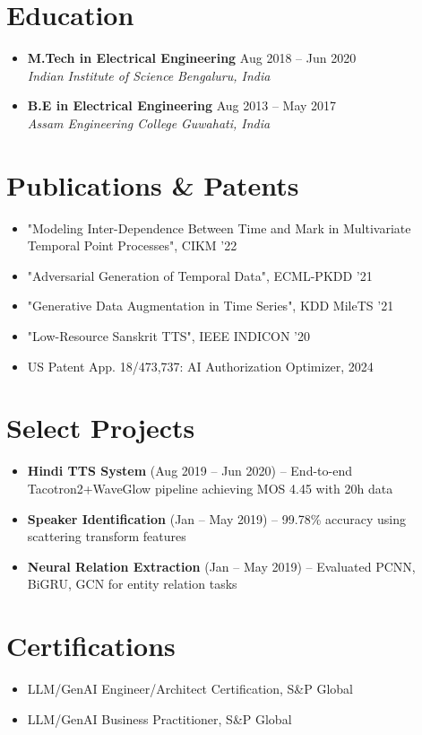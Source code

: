 \documentclass[letterpaper,11pt]{article}
\newcommand{\resumeItem}[1]{\item #1}
\newcommand{\resumeSubheading}[4]{\item \textbf{#1} \hfill #2\\\textit{#3} \hfill \textit{#4}}
\newcommand{\resumeProject}[3]{\item \textbf{#1} (#2) -- #3}
\begin{document}
\section{Education}
\begin{itemize}[leftmargin=*]
  \resumeSubheading{M.Tech in Electrical Engineering}{Aug 2018 -- Jun 2020}{Indian Institute of Science}{Bengaluru, India}
  \resumeSubheading{B.E in Electrical Engineering}{Aug 2013 -- May 2017}{Assam Engineering College}{Guwahati, India}
\end{itemize}

\section{Publications & Patents}
\begin{itemize}[leftmargin=*]
  \resumeItem{"Modeling Inter-Dependence Between Time and Mark in Multivariate Temporal Point Processes", CIKM ’22}
  \resumeItem{"Adversarial Generation of Temporal Data", ECML-PKDD ’21}
  \resumeItem{"Generative Data Augmentation in Time Series", KDD MileTS ’21}
  \resumeItem{"Low-Resource Sanskrit TTS", IEEE INDICON ’20}
  \resumeItem{US Patent App. 18/473,737: AI Authorization Optimizer, 2024}
\end{itemize}

\section{Select Projects}
\begin{itemize}[leftmargin=*]
  \resumeProject{Hindi TTS System}{Aug 2019 – Jun 2020}{End-to-end Tacotron2+WaveGlow pipeline achieving MOS 4.45 with 20h data}
  \resumeProject{Speaker Identification}{Jan – May 2019}{99.78\% accuracy using scattering transform features}
  \resumeProject{Neural Relation Extraction}{Jan – May 2019}{Evaluated PCNN, BiGRU, GCN for entity relation tasks}
\end{itemize}

\section{Certifications}
\begin{itemize}[leftmargin=*]
  \resumeItem{LLM/GenAI Engineer/Architect Certification, S&P Global}
  \resumeItem{LLM/GenAI Business Practitioner, S&P Global}
\end{itemize}
\end{document}

